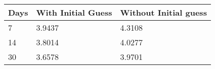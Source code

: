 \begin{tabular}{lll}
Days & With Initial Guess & Without Initial guess \\ 
\hline 
7 & 3.9437 & 4.3108 \\ 
14 & 3.8014 & 4.0277 \\ 
30 & 3.6578 & 3.9701 \\ 
\hline 
\end{tabular}